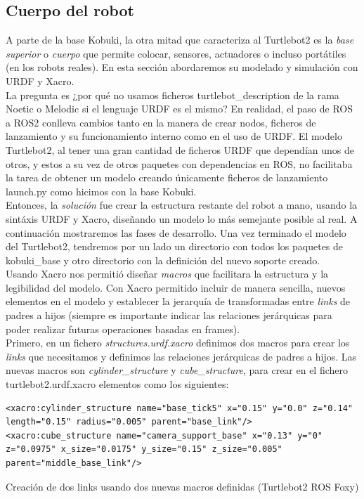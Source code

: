 \subsection{Cuerpo del robot}
\label{subsec:cuerpo_simulado}

A parte de la base Kobuki, la otra mitad que caracteriza al Turtlebot2 es la \textit{base superior} o \textit{cuerpo} que permite colocar, sensores, actuadores o incluso portátiles (en los robots reales). En esta sección abordaremos su modelado y simulación con URDF y Xacro.\\

La pregunta es ¿por qué no usamos ficheros turtlebot\_description de la rama Noetic o Melodic si el lenguaje URDF es el mismo? En realidad, el paso de ROS a ROS2 conlleva cambios tanto en la manera de crear nodos, ficheros de lanzamiento y su funcionamiento interno como en el uso de URDF. El modelo Turtlebot2, al tener una gran cantidad de ficheros URDF que dependían unos de otros, y estos a su vez de otros paquetes con dependencias en ROS, no facilitaba la tarea de obtener un modelo creando únicamente ficheros de lanzamiento launch.py como hicimos con la base Kobuki.\\

Entonces, la \textit{solución} fue crear la estructura restante del robot a mano, usando la sintáxis URDF y Xacro, diseñando un modelo lo más semejante posible al real. A continuación mostraremos las fases de desarrollo. Una vez terminado el modelo del Turtlebot2, tendremos por un lado un directorio con todos los paquetes de kobuki\_base y otro directorio con la definición del nuevo soporte creado.\\

Usando Xacro nos permitió diseñar \textit{macros} que facilitara la estructura y la legibilidad del modelo. Con Xacro permitido incluir de manera sencilla, nuevos elementos en el modelo y establecer la jerarquía de transformadas entre \textit{links} de padres a hijos (siempre es importante indicar las relaciones jerárquicas para poder realizar futuras operaciones basadas en frames).\\


Primero, en un fichero \textit{structures.urdf.xacro} definimos dos macros para crear los \textit{links} que necesitamos y definimos las relaciones jerárquicas de padres a hijos. Las nuevas macros son \textit{cylinder\_structure} y \textit{cube\_structure}, para crear en el fichero turtlebot2.urdf.xacro elementos como los siguientes:\\
\begin{code}[H]
\begin{lstlisting}
<xacro:cylinder_structure name="base_tick5" x="0.15" y="0.0" z="0.14" length="0.15" radius="0.005" parent="base_link"/>
<xacro:cube_structure name="camera_support_base" x="0.13" y="0" z="0.0975" x_size="0.0175" y_size="0.15" z_size="0.005" parent="middle_base_link"/>
\end{lstlisting}
\caption{Creación de dos links usando dos nuevas macros definidas (Turtlebot2 ROS Foxy)}
\label{fig:creacion_link_macro}
\end{code}

